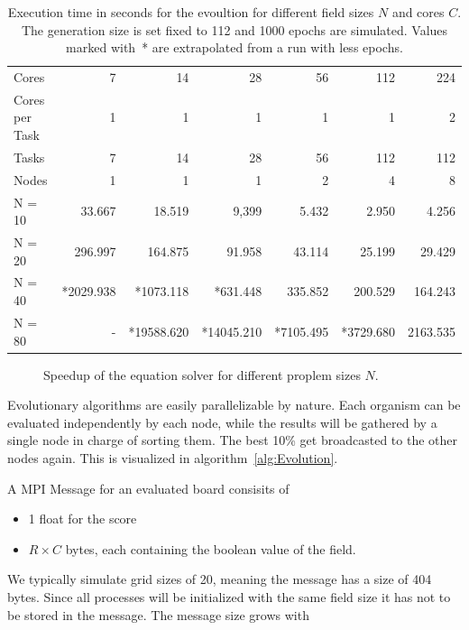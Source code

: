 \documentclass[12pt]{article}
\begin{document}
\begin{table}[p]
    \centering
    \begin{tabular}{lrrrrrr}
        \toprule
        Cores & 7 & 14 & 28 & 56 & 112 & 224 \\
        Cores per Task & 1 & 1 & 1 & 1 & 1 & 2 \\
        Tasks & 7 & 14 & 28 & 56 & 112 & 112 \\
        Nodes & 1 & 1 & 1 & 2 & 4 & 8 \\
        \midrule
        N = 10 & 33.667     & 18.519 & 9,399 & 5.432 & 2.950 & 4.256 \\
        N = 20 & 296.997    & 164.875 & 91.958 & 43.114 & 25.199 & 29.429 \\
        N = 40 & *2029.938 & *1073.118 & *631.448 & 335.852 & 200.529 & 164.243 \\
        N = 80 & - & *19588.620 & *14045.210 & *7105.495 & *3729.680 & 2163.535 \\
        \bottomrule
    \end{tabular}
    \caption{Execution time in seconds for the evoultion for different field sizes $N$ and cores $C$. The generation size is set fixed to 112 and 1000 epochs are simulated. Values marked with~* are extrapolated from a run with less epochs.}
    \label{tab:SpeedupEvolution}
\end{table}

\begin{figure}[p]
    \centering
    
    \caption{Speedup of the equation solver for different proplem sizes $N$.}
    \label{fig:SpeedupEvolution}
\end{figure}

Evolutionary algorithms are easily parallelizable by nature. Each organism can be evaluated independently by each node, while the results will be gathered by a single node in charge of sorting them. The best 10\% get broadcasted to the other nodes again. This is visualized in algorithm~\ref{alg:Evolution}.

A MPI Message for an evaluated board consisits of

\begin{itemize}
    \setlength{\parskip}{0pt}
    \setlength\itemsep{0pt}
    \item 1 float for the score
    \item $R \times C$ bytes, each containing the boolean value of the field.
\end{itemize}

We typically simulate grid sizes of 20, meaning the message has a size of 404 bytes. Since all processes will be initialized with the same field size it has not to be stored in the message. The message size grows with 
\end{document}
